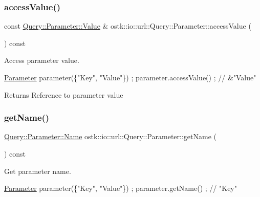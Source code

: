 \subsubsection{\texorpdfstring{access\+Value()}{accessValue()}}
{\footnotesize\ttfamily const \hyperlink{classostk_1_1io_1_1url_1_1_query_1_1_parameter_ada177e3a9d839a7900aae8a718207bbd}{Query\+::\+Parameter\+::\+Value} \& ostk\+::io\+::url\+::\+Query\+::\+Parameter\+::access\+Value (\begin{DoxyParamCaption}{ }\end{DoxyParamCaption}) const}



Access parameter value. 


\begin{DoxyCode}
\hyperlink{classostk_1_1io_1_1url_1_1_query_1_1_parameter_a0206a88a6546df8ec49219db4a8db3f3}{Parameter} parameter(\{\textcolor{stringliteral}{"Key"}, \textcolor{stringliteral}{"Value"}\}) ;
parameter.accessValue() ; \textcolor{comment}{// &"Value"}
\end{DoxyCode}


\begin{DoxyReturn}{Returns}
Reference to parameter value 
\end{DoxyReturn}
\mbox{\label{classostk_1_1io_1_1url_1_1_query_1_1_parameter_a78bc96d90e5cab55b26d6c44a69ea3f6}} 
\subsubsection{\texorpdfstring{get\+Name()}{getName()}}
{\footnotesize\ttfamily \hyperlink{classostk_1_1io_1_1url_1_1_query_1_1_parameter_ad176899a3555e0d0efeb0c13f73a8a80}{Query\+::\+Parameter\+::\+Name} ostk\+::io\+::url\+::\+Query\+::\+Parameter\+::get\+Name (\begin{DoxyParamCaption}{ }\end{DoxyParamCaption}) const}



Get parameter name. 


\begin{DoxyCode}
\hyperlink{classostk_1_1io_1_1url_1_1_query_1_1_parameter_a0206a88a6546df8ec49219db4a8db3f3}{Parameter} parameter(\{\textcolor{stringliteral}{"Key"}, \textcolor{stringliteral}{"Value"}\}) ;
parameter.getName() ; \textcolor{comment}{// "Key"}
\end{DoxyCode}


